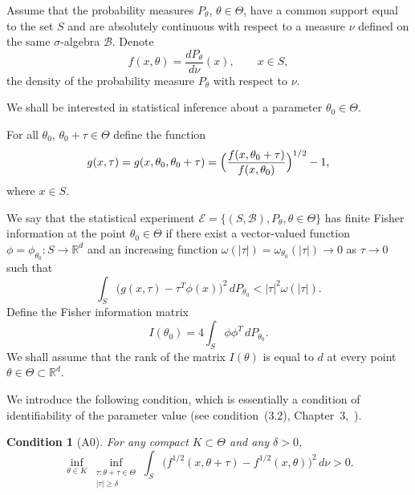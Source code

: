 \documentclass[11pt,a4paper]{article}
\newtheorem{condition}{Condition}
\begin{document}
Assume that the probability measures $P_\theta$, $\theta\in\Theta$, have a common support equal to the set $S$ and are absolutely continuous with respect to a measure $\nu$ defined on the same $\sigma$-algebra $\mathcal{B}$. Denote
\begin{equation}
f(x,\theta)=\frac{dP_\theta}{d\nu}(x),\qquad x\in S,
\label{eq:density}
\end{equation}
the density of the probability measure $P_\theta$ with respect to $\nu$.

We shall be interested in statistical inference about a parameter $\theta_0\in\Theta$.

For all $\theta_0$, $\theta_0+\tau\in\Theta$ define the function
\begin{equation}
g(x,\tau)=g(x,\theta_0,\theta_0+\tau)=\Bigl(\frac{f(x,\theta_0+\tau)}{f(x,\theta_0)}\Bigr)^{1/2}-1,
\label{eq:g}
\end{equation}
where $x\in S$.

We say that the statistical experiment $\mathcal{E}=\{(S,\mathcal{B}),P_\theta,\theta\in\Theta\}$ has finite Fisher information at the point $\theta_0\in\Theta$ if there exist a vector-valued function $\phi=\phi_{\theta_0}:S\to\mathbb{R}^d$ and an increasing function $\omega(|\tau|)=\omega_{\theta_0}(|\tau|)\to 0$ as $\tau\to 0$ such that
\begin{equation}
\int_S\bigl(g(x,\tau)-\tau^T\phi(x)\bigr)^2\,dP_{\theta_0}<|\tau|^2\omega(|\tau|).
\label{eq:FI}
\end{equation}
Define the Fisher information matrix
\begin{equation}
I(\theta_0)=4\int_S\phi\phi^T\,dP_{\theta_0}.
\label{eq:I}
\end{equation}
We shall assume that the rank of the matrix $I(\theta)$ is equal to $d$ at every point $\theta\in\Theta\subset\mathbb{R}^d$.

We introduce the following condition, which is essentially a condition of identifiability of the parameter value (see condition~(3.2), Chapter~3,~\cite{10}).

\begin{condition}[A0]
For any compact $K\subset\Theta$ and any $\delta>0$,
\begin{equation}
\inf_{\theta\in K}\inf_{\substack{\tau:\theta+\tau\in\Theta\\|\tau|\ge\delta}}
\int_S\bigl(f^{1/2}(x,\theta+\tau)-f^{1/2}(x,\theta)\bigr)^2\,d\nu>0.
\label{eq:A0}
\end{equation}
\end{condition}
\end{document}
